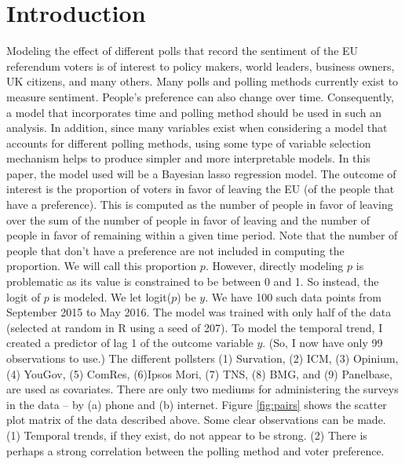 \documentclass{../../tex_template/asaproc}
\begin{document}
\section{Introduction}
Modeling the effect of different polls that record the sentiment of the EU
referendum voters is of interest to policy makers, world leaders, business
owners, UK citizens, and many others. Many polls and polling methods currently
exist to measure sentiment. People's preference can also change over time.
Consequently, a model that incorporates time and polling method should be used
in such an analysis. In addition, since many variables exist when considering a
model that accounts for different polling methods, using some type of variable
selection mechanism helps to produce simpler and more interpretable models.
In this paper, the model used will be a Bayesian lasso regression model.
The outcome of interest is the proportion of voters in favor of leaving the
EU (of the people that have a preference). This is computed as the number
of people in favor of leaving over the sum of the number of people
in favor of leaving and the number of people in favor of remaining within
a given time period. Note that the number of people that don't have a preference
are not included in computing the proportion. We will call this proportion 
$p$. However, directly modeling $p$ is problematic as its value is constrained
to be between 0 and 1. So instead, the logit of $p$ is modeled. We let logit($p$)
be $y$. We have 100 such data points from September 2015 to May 2016. The model
was trained with only half of the data (selected at random in R using a seed of 207).
To model the temporal trend, I created a predictor of lag 1 of the outcome
variable $y$. (So, I now have only 99 observations to use.) The different 
pollsters (1) Survation, (2) ICM, (3) Opinium, (4) YouGov, (5) ComRes, (6)Ipsos Mori,
(7) TNS, (8) BMG, and (9) Panelbase, are used as covariates. There are
only two mediums for administering the surveys in the data -- by (a) phone
and (b) internet. Figure \ref{fig:pairs} shows the scatter plot matrix of
the data described above. Some clear observations can be made. (1) Temporal 
trends, if they exist, do not appear to be strong. (2) There is perhaps 
a strong correlation between the polling method and voter preference.
\end{document}
